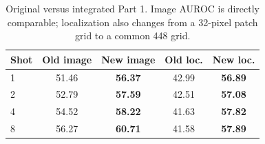 \begin{table}[t]
\centering
\small
\caption{Original versus integrated Part 1. Image AUROC is directly
comparable; localization also changes from a 32-pixel patch grid to a common
448 grid.}
\label{tab:integration}
\begin{tabular}{lcccc}
\toprule
Shot & Old image & New image & Old loc. & New loc. \\
\midrule
1 & 51.46 & \textbf{56.37} & 42.99 & \textbf{56.89} \\
2 & 52.79 & \textbf{57.59} & 42.51 & \textbf{57.08} \\
4 & 54.52 & \textbf{58.22} & 41.63 & \textbf{57.82} \\
8 & 56.27 & \textbf{60.71} & 41.58 & \textbf{57.89} \\
\bottomrule
\end{tabular}
\end{table}

